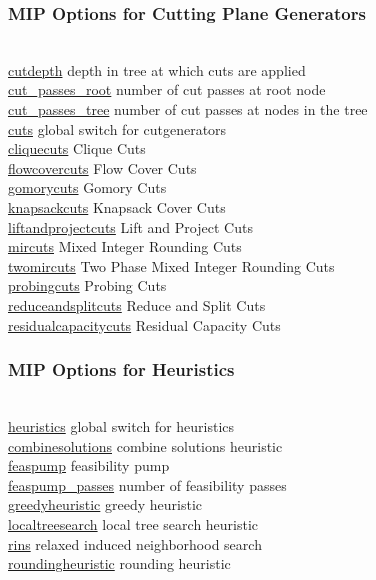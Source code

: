 \subsubsection{MIP Options for Cutting Plane Generators}
\begin{tabbing}
\hspace {1.3in} \= \\
\hyperlink{cutdepth}
{cutdepth} \> depth in tree at which cuts are applied \\
\hyperlink{cut_passes_root}
{cut\_passes\_root} \> number of cut passes at root node \\
\hyperlink{cut_passes_tree}
{cut\_passes\_tree} \> number of cut passes at nodes in the tree \\
\hyperlink{cuts}
{cuts} \> global switch for cutgenerators \\
\hyperlink{cliquecuts}
{cliquecuts} \> Clique Cuts \\
\hyperlink{flowcovercuts}
{flowcovercuts} \> Flow Cover Cuts \\
\hyperlink{gomorycuts}
{gomorycuts} \> Gomory Cuts \\
\hyperlink{knapsackcuts}
{knapsackcuts} \> Knapsack Cover Cuts \\
\hyperlink{liftandprojectcuts}
{liftandprojectcuts} \> Lift and Project Cuts \\
\hyperlink{mircuts}
{mircuts} \> Mixed Integer Rounding Cuts \\
\hyperlink{twomircuts}
{twomircuts} \> Two Phase Mixed Integer Rounding Cuts \\
\hyperlink{probingcuts}
{probingcuts} \> Probing Cuts \\
\hyperlink{reduceandsplitcuts}
{reduceandsplitcuts} \> Reduce and Split Cuts \\
\hyperlink{residualcapacitycuts}
{residualcapacitycuts} \> Residual Capacity Cuts
\end{tabbing}


\subsubsection{MIP Options for Heuristics}
\begin{tabbing}
\hspace {1.3in} \= \\
\hyperlink{heuristics}
{heuristics} \> global switch for heuristics \\
\hyperlink{combinesolutions}
{combinesolutions} \> combine solutions heuristic \\
\hyperlink{feaspump}
{feaspump} \> feasibility pump \\
\hyperlink{feaspump_passes}
{feaspump\_passes} \> number of feasibility passes \\
\hyperlink{greedyheuristic}
{greedyheuristic} \> greedy heuristic \\
\hyperlink{localtreesearch}
{localtreesearch} \> local tree search heuristic \\
\hyperlink{rins}
{rins} \> relaxed induced neighborhood search \\
\hyperlink{roundingheuristic}
{roundingheuristic} \> rounding heuristic
\end{tabbing}

